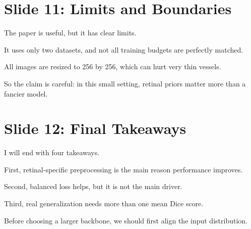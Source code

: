 \documentclass[12pt,a4paper]{article}
\begin{document}
\newpage

\section*{Slide 11: Limits and Boundaries}

The paper is useful, but it has clear limits.

It uses only two datasets, and not all training budgets are perfectly matched.

All images are resized to 256 by 256, which can hurt very thin vessels.

So the claim is careful: in this small setting, retinal priors matter more than a fancier model.

\newpage

\section*{Slide 12: Final Takeaways}

I will end with four takeaways.

First, retinal-specific preprocessing is the main reason performance improves.

Second, balanced loss helps, but it is not the main driver.

Third, real generalization needs more than one mean Dice score.

Before choosing a larger backbone, we should first align the input distribution.
\end{document}
